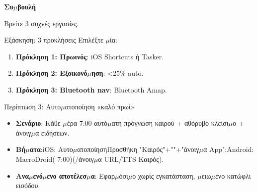 \textbf{Συ$\mu$βουλή}\par

Βρείτε 3 συχνές εργασίες.

\begin{tcbpractice}{Εξάσκηση: 3 προκλήσεις}
Επιλέξτε $\mu$ία:

\begin{enumerate}
  \item \textbf{Πρόκληση 1: Πρωινός}: iOS Shortcuts ή Tasker.
  \item \textbf{Πρόκληση 2: Εξοικονό$\mu$ηση}: <25\% auto.
  \item \textbf{Πρόκληση 3: Bluetooth nav}: Bluetooth Amap.
\end{enumerate}

\end{tcbpractice}

\begin{tcbinfo}{Περίπτωση 3: Αυτο$\mu$ατοποίηση «καλό πρωί»}
\begin{itemize}
  \item \textbf{Σενάριο}: Κάθε $\mu$έρα 7:00 αυτό$\mu$ατη πρόγνωση καιρού + αθόρυβο κλείσι$\mu$ο + άνοιγ$\mu$α ειδήσεων.
  \item \textbf{Βή$\mu$ατα}:iOS: Αυτο$\mu$ατοποίησηΠροσθήκη "Καιρός"+""+"άνοιγ$\mu$α App";Android: MacroDroid( 7:00)(/άνοιγ$\mu$α URL/TTS Καιρός).
  \item \textbf{Ανα$\mu$ενό$\mu$ενο αποτέλεσ$\mu$α}: Εφαρ$\mu$όσι$\mu$ο χωρίς εγκατάσταση, $\mu$ειω$\mu$ένο κατώφλι εισόδου.
\end{itemize}

\end{tcbinfo}
